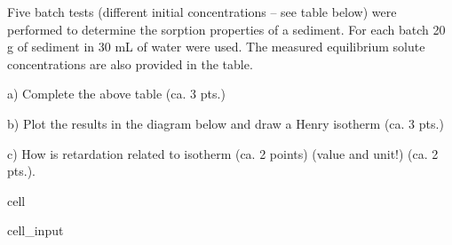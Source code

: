 \documentclass[letterpaper,10pt,english]{jupyterBook}
\begin{document}
\sphinxAtStartPar
Five batch tests (different initial concentrations – see table below) were performed to determine the sorption properties of a sediment. For each batch 20 g of sediment in 30 mL of water were used. The measured equilibrium solute concentrations are also provided in the table.

\sphinxAtStartPar
a)	Complete the above table								(ca. 3 pts.)

\sphinxAtStartPar
b)	Plot the results in the diagram below and draw a Henry isotherm			(ca. 3 pts.)

\sphinxAtStartPar
c)	How is retardation related to isotherm (ca. 2 points)
(value and unit!)		(ca. 2 pts.).

\begin{sphinxuseclass}{cell}\begin{sphinxVerbatimInput}

\begin{sphinxuseclass}{cell_input}
\begin{sphinxVerbatim}[commandchars=\\\{\}]
  \PYG{p}{[}     \PYG{p}{]}
  \PYG{p}{[}\PYG{p}{]}
  \PYG{p}{[}    \PYG{p}{]}
  \PYG{p}{[}    \PYG{p}{]}
     
   
  
   
\end{sphinxVerbatim}


\end{sphinxuseclass}
\end{sphinxVerbatimInput}
\end{sphinxuseclass}
\end{document}
